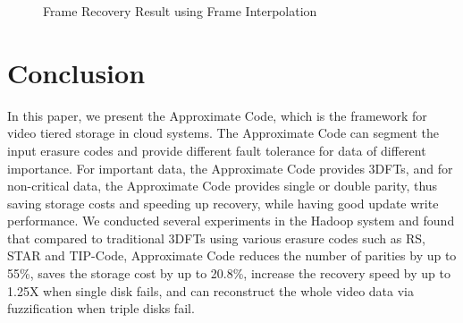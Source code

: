 \documentclass[sigconf]{acmart}
\begin{document}
\begin{figure}[ht]
\centering
{}

\caption{Frame Recovery Result using Frame Interpolation}
\label{fig-frameRecovery}
\end{figure}

\section{Conclusion}\label{Conclusion}
In this paper, we present the Approximate Code, which is the framework for video tiered storage in cloud systems. The Approximate Code can segment the input erasure codes and provide different fault tolerance for data of different importance. For important data, the Approximate Code provides 3DFTs, and for non-critical data, the Approximate Code provides single or double parity, thus saving storage costs and speeding up recovery, while having good update write performance. We conducted several experiments in the Hadoop system and found that compared to traditional 3DFTs using various erasure codes such as RS, STAR and TIP-Code, Approximate Code reduces the number of parities by up to 55\%, saves the storage cost by up to 20.8\%, increase the recovery speed by up to 1.25X when single disk fails, and can reconstruct the whole video data via fuzzification when triple disks fail.



\end{document}
